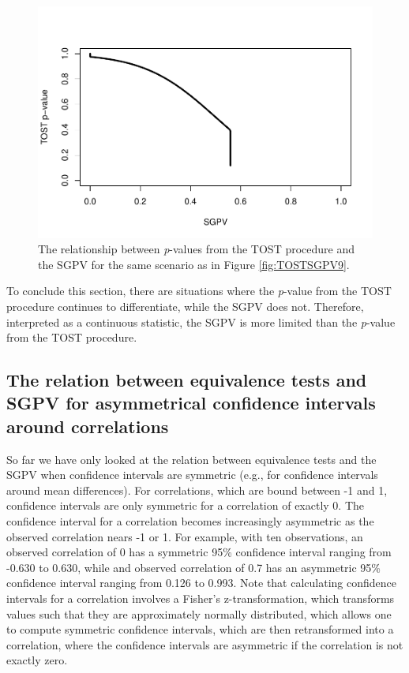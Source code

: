 \documentclass[,man,floatsintext]{apa6}
\begin{document}
\begin{figure}
\centering
\includegraphics{manuscript.R1_files/figure-latex/TOSTSGPV10-1.pdf}
\caption{\label{fig:TOSTSGPV10}The relationship between \emph{p}-values from
the TOST procedure and the SGPV for the same scenario as in Figure
\ref{fig:TOSTSGPV9}.}
\end{figure}

To conclude this section, there are situations where the \emph{p}-value
from the TOST procedure continues to differentiate, while the SGPV does
not. Therefore, interpreted as a continuous statistic, the SGPV is more
limited than the \emph{p}-value from the TOST procedure.

\subsection{The relation between equivalence tests and SGPV for
asymmetrical confidence intervals around
correlations}\label{the-relation-between-equivalence-tests-and-sgpv-for-asymmetrical-confidence-intervals-around-correlations}

So far we have only looked at the relation between equivalence tests and
the SGPV when confidence intervals are symmetric (e.g., for confidence
intervals around mean differences). For correlations, which are bound
between -1 and 1, confidence intervals are only symmetric for a
correlation of exactly 0. The confidence interval for a correlation
becomes increasingly asymmetric as the observed correlation nears -1 or
1. For example, with ten observations, an observed correlation of 0 has
a symmetric 95\% confidence interval ranging from -0.630 to 0.630, while
and observed correlation of 0.7 has an asymmetric 95\% confidence
interval ranging from 0.126 to 0.993. Note that calculating confidence
intervals for a correlation involves a Fisher's z-transformation, which
transforms values such that they are approximately normally distributed,
which allows one to compute symmetric confidence intervals, which are
then retransformed into a correlation, where the confidence intervals
are asymmetric if the correlation is not exactly zero.
\end{document}
